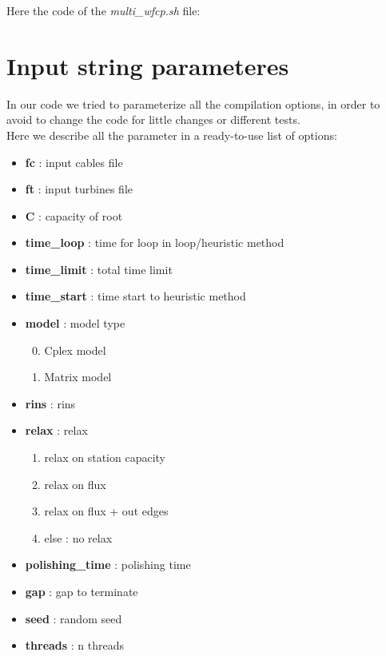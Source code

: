 \begin{appendices}
Here the code of the \textit{multi\_wfcp.sh} file:
\newpage


\chapter{Input string parameteres}
In our code we tried to parameterize all the compilation options, in order to avoid to change the code for little changes or different tests. \\
Here we describe all the parameter in a ready-to-use list of options: 
\begin{itemize}
\setlength{\parskip}{0pt}
\setlength{\itemsep}{0.5pt plus 1pt}
\item \textbf{fc} : input cables file
\item \textbf{ft} : input turbines file
\item \textbf{C} : capacity of root
\item \textbf{time\_loop} : time for loop in loop/heuristic method
\item \textbf{time\_limit} : total time limit
\item \textbf{time\_start} : time start to heuristic method
\item \textbf{model} : model type
\begin{enumerate}\setcounter{enumi}{-1}
\setlength{\parskip}{0pt}
\setlength{\itemsep}{0pt plus 1pt}
	\item Cplex model
	\item Matrix model
\end{enumerate}
\item \textbf{rins} : rins
\item \textbf{relax} : relax
\begin{enumerate}\setcounter{enumi}{0}
\setlength{\parskip}{0pt}
\setlength{\itemsep}{0pt plus 1pt}
	\item relax on station capacity
	\item relax on flux
	\item relax on flux + out edges
	\item[] else : no relax
\end{enumerate}
\item \textbf{polishing\_time} : polishing time
\item \textbf{gap} : gap to terminate
\item \textbf{seed} : random seed
\item \textbf{threads} : n threads

\end{itemize}
\end{appendices}
